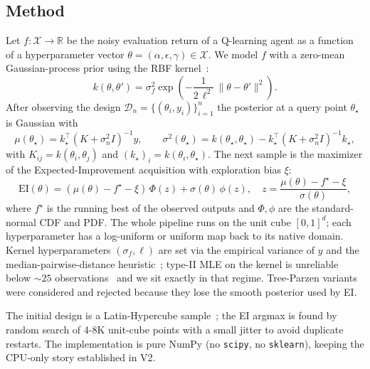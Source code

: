 \documentclass[11pt]{article}
\begin{document}
\subsection{Method}

Let $f : \mathcal{X} \to \mathbb{R}$ be the noisy evaluation return of
a Q-learning agent as a function of a hyperparameter vector
$\theta = (\alpha, \epsilon, \gamma) \in \mathcal{X}$. We model $f$
with a zero-mean Gaussian-process prior using the RBF
kernel~\citep{rasmussen2006}:
\begin{equation}
k(\theta, \theta')
   = \sigma_f^2 \exp\!\left(
     -\frac{1}{2\,\ell^{2}}\,\|\theta - \theta'\|^{2}
   \right).
\end{equation}
After observing the design $\mathcal{D}_n = \{(\theta_i, y_i)\}_{i=1}^n$
the posterior at a query point $\theta_\star$ is Gaussian with
\begin{equation}
\mu(\theta_\star)
  = k_\star^{\!\top}(K + \sigma_n^{2} I)^{-1} y,
\qquad
\sigma^{2}(\theta_\star)
  = k(\theta_\star, \theta_\star)
  - k_\star^{\!\top}(K + \sigma_n^{2} I)^{-1} k_\star,
\label{eq:gp-posterior}
\end{equation}
with $K_{ij} = k(\theta_i, \theta_j)$ and
$(k_\star)_i = k(\theta_i, \theta_\star)$. The next sample is the
maximizer of the Expected-Improvement acquisition with exploration
bias $\xi$:
\begin{equation}
\mathrm{EI}(\theta)
  = (\mu(\theta) - f^{\star} - \xi)\,\Phi(z)
  + \sigma(\theta)\,\phi(z),
\quad
z = \frac{\mu(\theta) - f^{\star} - \xi}{\sigma(\theta)},
\label{eq:ei}
\end{equation}
where $f^{\star}$ is the running best of the observed outputs and
$\Phi, \phi$ are the standard-normal CDF and PDF. The whole pipeline
runs on the unit cube $[0,1]^d$; each hyperparameter has a
log-uniform or uniform map back to its native domain. Kernel
hyperparameters $(\sigma_f, \ell)$ are set via the empirical variance
of $y$ and the median-pairwise-distance heuristic~\citep{garreau2018};
type-II MLE on the kernel is unreliable below
$\sim 25$ observations~\citep[\S 3]{snoek2012} and we sit exactly in
that regime. Tree-Parzen variants~\citep{bergstra2011} were
considered and rejected because they lose the smooth posterior used by
EI.

The initial design is a Latin-Hypercube sample~\citep{mckay1979}; the
EI argmax is found by random search of 4-8K unit-cube points with a
small jitter to avoid duplicate restarts. The implementation is pure
NumPy (no \texttt{scipy}, no \texttt{sklearn}), keeping the CPU-only
story established in V2.
\end{document}
